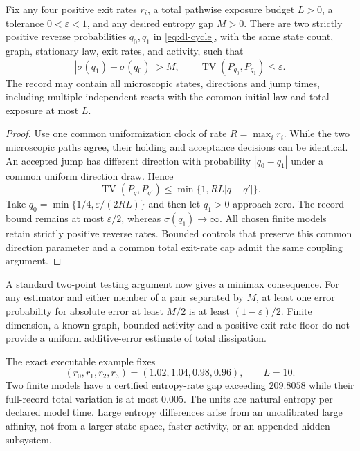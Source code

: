 \begin{theorem}
\label{thm:dl-budget}
Fix any four positive exit rates $r_i$, a total pathwise exposure budget $L>0$,
a tolerance $0<\varepsilon<1$, and any desired entropy gap $M>0$. There are two
strictly positive reverse probabilities $q_0,q_1$ in \eqref{eq:dl-cycle}, with
the same state count, graph, stationary law, exit rates, and activity, such that
\[
 |\sigma(q_1)-\sigma(q_0)|>M,
 \qquad \operatorname{TV}(P_{q_0},P_{q_1})\le\varepsilon.
\]
The record may contain all microscopic states, directions and jump times,
including multiple independent resets with the common initial law and total
exposure at most $L$.
\end{theorem}
\begin{proof}
Use one common uniformization clock of rate $R=\max_i r_i$. While the two
microscopic paths agree, their holding and acceptance decisions can be identical.
An accepted jump has different direction with probability $|q_0-q_1|$ under
a common uniform direction draw. Hence
\begin{equation}
 \operatorname{TV}(P_q,P_{q'})\le\min\{1,RL|q-q'|\}.
                                                        \label{eq:dl-full-coupling}
\end{equation}
Take $q_0=\min\{1/4,\varepsilon/(2RL)\}$ and then let $q_1>0$ approach zero.
The record bound remains at most $\varepsilon/2$, whereas
$\sigma(q_1)\to\infty$. All chosen finite models retain strictly positive
reverse rates. Bounded controls that preserve this common direction parameter
and a common total exit-rate cap admit the same coupling argument.
\end{proof}

A standard two-point testing argument now gives a minimax consequence. For any
estimator and either member of a pair separated by $M$, at least one error
probability for absolute error at least $M/2$ is at least
$(1-\varepsilon)/2$. Finite dimension, a known graph, bounded activity and a
positive exit-rate floor do not provide a uniform additive-error estimate of
total dissipation.

The exact executable example fixes
\[
 (r_0,r_1,r_2,r_3)=(1.02,1.04,0.98,0.96),\qquad L=10.
\]
Two finite models have a certified entropy-rate gap exceeding $209.8058$
while their full-record total variation is at most $0.005$. The units are
natural entropy per declared model time. Large entropy differences arise from
an uncalibrated large affinity, not from a larger state space, faster activity,
or an appended hidden subsystem.

